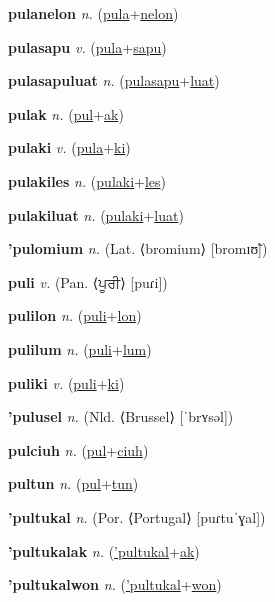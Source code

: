 \textbf{\hypertarget{pulanelon}{pulanelon}} \textit{n.} (\hyperlink{pula}{pula}+\allowbreak \hyperlink{nelon}{nelon})


\textbf{\hypertarget{pulasapu}{pulasapu}} \textit{v.} (\hyperlink{pula}{pula}+\allowbreak \hyperlink{sapu}{sapu})


\textbf{\hypertarget{pulasapuluat}{pulasapuluat}} \textit{n.} (\hyperlink{pulasapu}{pulasapu}+\allowbreak \hyperlink{luat}{luat})


\textbf{\hypertarget{pulak}{pulak}} \textit{n.} (\hyperlink{pul}{pul}+\allowbreak \hyperlink{ak}{ak})


\textbf{\hypertarget{pulaki}{pulaki}} \textit{v.} (\hyperlink{pula}{pula}+\allowbreak \hyperlink{ki}{ki})


\textbf{\hypertarget{pulakiles}{pulakiles}} \textit{n.} (\hyperlink{pulaki}{pulaki}+\allowbreak \hyperlink{les}{les})


\textbf{\hypertarget{pulakiluat}{pulakiluat}} \textit{n.} (\hyperlink{pulaki}{pulaki}+\allowbreak \hyperlink{luat}{luat})


\textbf{\hypertarget{'pulomium}{'pulomium}} \textit{n.} (Lat. ⟨bromium⟩ [bromɪʊ̃])


\textbf{\hypertarget{puli}{puli}} \textit{v.} (Pan. ⟨{\gurmukhi{}ਪੂਰੀ}⟩ [puɾi])


\textbf{\hypertarget{pulilon}{pulilon}} \textit{n.} (\hyperlink{puli}{puli}+\allowbreak \hyperlink{lon}{lon})


\textbf{\hypertarget{pulilum}{pulilum}} \textit{n.} (\hyperlink{puli}{puli}+\allowbreak \hyperlink{lum}{lum})


\textbf{\hypertarget{puliki}{puliki}} \textit{v.} (\hyperlink{puli}{puli}+\allowbreak \hyperlink{ki}{ki})


\textbf{\hypertarget{'pulusel}{'pulusel}} \textit{n.} (Nld. ⟨Brussel⟩ [ˈbrʏsəl])


\textbf{\hypertarget{pulciuh}{pulciuh}} \textit{n.} (\hyperlink{pul}{pul}+\allowbreak \hyperlink{ciuh}{ciuh})


\textbf{\hypertarget{pultun}{pultun}} \textit{n.} (\hyperlink{pul}{pul}+\allowbreak \hyperlink{tun}{tun})


\textbf{\hypertarget{'pultukal}{'pultukal}} \textit{n.} (Por. ⟨Portugal⟩ [puɾtuˈɣal])


\textbf{\hypertarget{'pultukalak}{'pultukalak}} \textit{n.} (\hyperlink{'pultukal}{'pultukal}+\allowbreak \hyperlink{ak}{ak})


\textbf{\hypertarget{'pultukalwon}{'pultukalwon}} \textit{n.} (\hyperlink{'pultukal}{'pultukal}+\allowbreak \hyperlink{won}{won})


